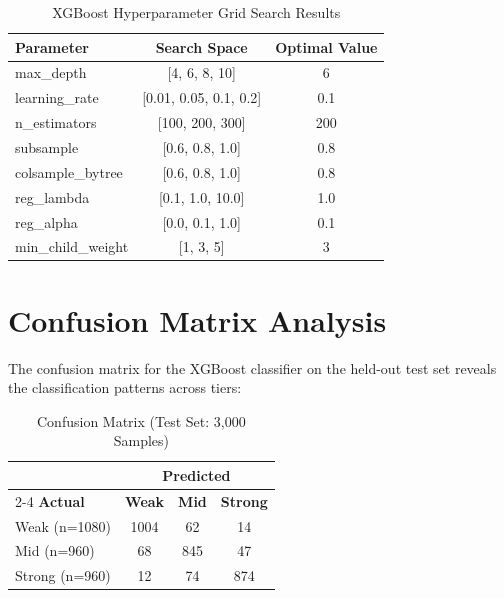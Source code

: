 \documentclass[oneside,12pt,a4paper]{report}
\begin{document}
\begin{table}[htbp]
  \centering
  \caption{XGBoost Hyperparameter Grid Search Results}
  \label{tab:hyperparams}
  \begin{tabular}{lcc}
    \toprule
    \textbf{Parameter} & \textbf{Search Space} & \textbf{Optimal Value} \\
    \midrule
    max\_depth & [4, 6, 8, 10] & 6 \\
    learning\_rate & [0.01, 0.05, 0.1, 0.2] & 0.1 \\
    n\_estimators & [100, 200, 300] & 200 \\
    subsample & [0.6, 0.8, 1.0] & 0.8 \\
    colsample\_bytree & [0.6, 0.8, 1.0] & 0.8 \\
    reg\_lambda & [0.1, 1.0, 10.0] & 1.0 \\
    reg\_alpha & [0.0, 0.1, 1.0] & 0.1 \\
    min\_child\_weight & [1, 3, 5] & 3 \\
    \bottomrule
  \end{tabular}
\end{table}

\section{Confusion Matrix Analysis}

The confusion matrix for the XGBoost classifier on the held-out test set reveals the classification patterns across tiers:

\begin{table}[htbp]
  \centering
  \caption{Confusion Matrix (Test Set: 3,000 Samples)}
  \label{tab:confusion}
  \begin{tabular}{lccc}
    \toprule
    & \multicolumn{3}{c}{\textbf{Predicted}} \\
    \cmidrule{2-4}
    \textbf{Actual} & \textbf{Weak} & \textbf{Mid} & \textbf{Strong} \\
    \midrule
    Weak (n=1080) & 1004 & 62 & 14 \\
    Mid (n=960) & 68 & 845 & 47 \\
    Strong (n=960) & 12 & 74 & 874 \\
    \bottomrule
  \end{tabular}
\end{table}
\end{document}
